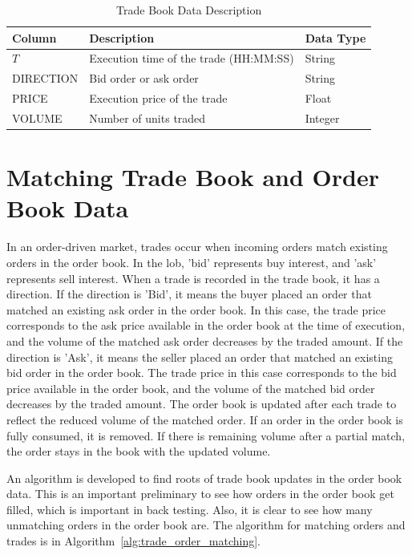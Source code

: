 \begin{table}[h] 
    \centering 
    \begin{tabular}{lll} 
        \toprule 
        \textbf{Column} & \textbf{Description} & \textbf{Data Type} \\ 
        \midrule 
        $T$ & Execution time of the trade (HH:MM:SS) & String \\
        DIRECTION & Bid order or ask order & String \\
        PRICE & Execution price of the trade & Float \\ 
        VOLUME & Number of units traded & Integer \\  
        \bottomrule 
    \end{tabular} 
    \caption{Trade Book Data Description}
    \label{tb: trade book data description}  
\end{table}

\section{Matching Trade Book and Order Book Data} \label{sec:match-order-trade}
In an order-driven market, trades occur when incoming orders match existing orders in the order book. In the \gls{lob}, 'bid' represents buy interest, and 'ask' represents sell interest. When a trade is recorded in the trade book, it has a direction. If the direction is 'Bid', it means the buyer placed an order that matched an existing ask order in the order book. In this case, the trade price corresponds to the ask price available in the order book at the time of execution, and the volume of the matched ask order decreases by the traded amount. If the direction is 'Ask', it means the seller placed an order that matched an existing bid order in the order book. The trade price in this case corresponds to the bid price available in the order book, and the volume of the matched bid order decreases by the traded amount. The order book is updated after each trade to reflect the reduced volume of the matched order. If an order in the order book is fully consumed, it is removed. If there is remaining volume after a partial match, the order stays in the book with the updated volume. 

An algorithm is developed to find roots of trade book updates in the order book data. This is an important preliminary to see how orders in the order book get filled, which is important in back testing. Also, it is clear to see how many unmatching orders in the order book are. The algorithm for matching orders and trades is in Algorithm~\ref{alg:trade_order_matching}.

